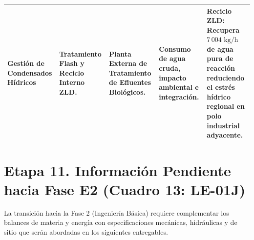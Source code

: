\documentclass[10pt,letterpaper]{article}
\begin{document}
\begin{table}[H]
\begin{tabularx}{\textwidth}{>{\raggedright\arraybackslash}p{2.35cm} >{\raggedright\arraybackslash}p{2.45cm} >{\raggedright\arraybackslash}p{2.45cm} >{\raggedright\arraybackslash}p{2.15cm} X}
Gestión de Condensados Hídricos & Tratamiento Flash y Reciclo Interno ZLD. & Planta Externa de Tratamiento de Efluentes Biológicos. & Consumo de agua cruda, impacto ambiental e integración. & \textbf{Reciclo ZLD:} Recupera $7\,004\text{ kg/h}$ de agua pura de reacción reduciendo el estrés hídrico regional en polo industrial adyacente. \\
\bottomrule
\end{tabularx}
\end{table}

\newpage
\section{Etapa 11. Información Pendiente hacia Fase E2 (Cuadro 13: LE-01J)}

La transición hacia la Fase 2 (Ingeniería Básica) requiere complementar los balances de materia y energía con especificaciones mecánicas, hidráulicas y de sitio que serán abordadas en los siguientes entregables.
\end{document}
